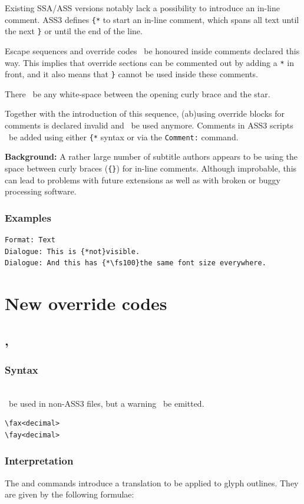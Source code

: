 \documentclass{spec}
\newcommand{\syntax}[1]{
	\subsubsection*{Syntax}
	\begin{tabbing}
	\hspace{2cm}\=\\[-16pt]
	#1
	\end{tabbing}
}
\gdef\compat{}
\newcommand{\mayuse}[1]{\may\ be used in non-ASS3 files, but a warning \should\ be emitted.%
\gappto{\compat}{\hspace{9pt} #1 & optional\\[3pt]}}
\begin{document}
Existing SSA/ASS versions notably lack a possibility to introduce an
in-line comment. ASS3 defines \texttt{\{*} to start an in-line comment,
which spans all text until the next \texttt{\}} or until the end of the line.

Escape sequences and override codes \mustnot\ be honoured inside comments
declared this way. This implies that override sections can be commented out by
adding a \texttt{*} in front, and it also means that \texttt{\}} cannot
be used inside these comments.

There \mustnot\ be any white-space between the opening curly brace and the
star.

Together with the introduction of this sequence, (ab)using override blocks
for comments is declared invalid and \mustnot\ be used anymore. Comments in
ASS3 scripts \must\ be added using either \texttt{\{*} syntax or via the
\texttt{Comment:} command.

{\footnotesize
\textbf{Background:} A rather large number of subtitle authors appears to be
using the space between curly braces (\texttt{\{\}}) for in-line comments.
Although improbable, this can lead to problems with future extensions
as well as with broken or buggy processing software.
}

\subsubsection*{Examples}
\begin{verbatim}
Format: Text
Dialogue: This is {*not}visible.
Dialogue: And this has {*\fs100}the same font size everywhere.
\end{verbatim}

\section{New override codes}
\subsection{, }
\syntax{\mayuse{\oc{fax}, \oc{fay}}}
\begin{verbatim}
\fax<decimal>
\fay<decimal>
\end{verbatim}

\subsubsection*{Interpretation}
The  and  commands introduce a translation to be applied to
glyph outlines. They are given by the following formulae:
\end{document}
